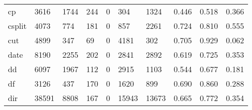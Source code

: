 \begin{longtable}{lp{1.3cm}p{1.3cm}p{1.3cm}p{1.3cm}p{1.3cm}p{1.3cm}p{1.3cm}p{1.3cm}p{1.3cm}}
cp        &                   3616 &                               1744 &                               244 &                                0 &                               304 &                            1324 &                                0.446 &                                  0.518 &                                0.366 \\
csplit    &                   4073 &                                774 &                               181 &                                0 &                               857 &                            2261 &                                0.724 &                                  0.810 &                                0.555 \\
cut       &                   4899 &                                347 &                                69 &                                0 &                              4181 &                             302 &                                0.705 &                                  0.929 &                                0.062 \\
date      &                   8190 &                               2255 &                               202 &                                0 &                              2841 &                            2892 &                                0.619 &                                  0.725 &                                0.353 \\
dd        &                   6097 &                               1967 &                               112 &                                0 &                              2915 &                            1103 &                                0.544 &                                  0.677 &                                0.181 \\
df        &                   3126 &                                437 &                               170 &                                0 &                              1620 &                             899 &                                0.690 &                                  0.860 &                                0.288 \\
dir       &                  38591 &                               8808 &                               167 &                                0 &                             15943 &                           13673 &                                0.665 &                                  0.772 &                                0.354 \\

\end{longtable}
